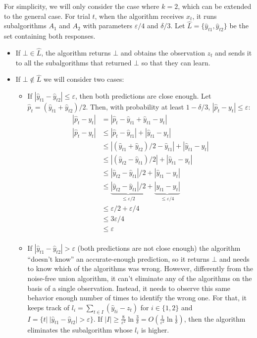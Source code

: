 For simplicity, we will only consider the case where $k = 2$, which can be
extended to the general case. For trial $t$, when the algorithm receives $x_t$,
it runs subalgorithms $A_1$ and $A_2$ with parameters $\varepsilon/4$ and
$\delta/3$. Let $\hat{L} = \{\hat{y}_{t1}, \hat{y}_{t2}\}$ be the set containing
both responses.
\begin{itemize}
  \item If $\bot \in \hat{L}$, the algorithm returns $\bot$ and obtains the
  observation $z_t$ and sends it to all the subalgorithms that returned $\bot$
  so that they can learn.
  \item If $\bot \notin \hat{L}$ we will consider two cases:
  \begin{itemize}
    \item If $|\hat{y}_{t1} - \hat{y}_{t2}| \leq \varepsilon$, then both predictions
    are close enough. Let $\hat{p}_t = (\hat{y}_{t1} + \hat{y}_{t2})/2 $. Then,
    with probability at least $1 - \delta/3$, $|\hat{p}_t - y_t| \leq \varepsilon$:
    \begin{align*}
    |\hat{p}_t - y_t| &= |\hat{p}_t - \hat{y}_{t1} + \hat{y}_{t1} - y_t| \\
    |\hat{p}_t - y_t| &\leq |\hat{p}_t - \hat{y}_{t1}| + |\hat{y}_{t1} - y_t| \\
                      &\leq |(\hat{y}_{t1} + \hat{y}_{t2})/2 - \hat{y}_{t1}| + |\hat{y}_{t1} - y_t| \\
                      &\leq |(\hat{y}_{t2} - \hat{y}_{t1})/2| + |\hat{y}_{t1} - y_t| \\
                      &\leq |\hat{y}_{t2} - \hat{y}_{t1}|/2 + |\hat{y}_{t1} - y_t| \\
                      &\leq \underbrace{|\hat{y}_{t2} - \hat{y}_{t1}|/2}_{\leq \varepsilon/2} + \underbrace{|y_{t1} - y_t|}_{\leq \varepsilon/4} \\
                      &\leq \varepsilon/2 + \varepsilon/4 \\
                      &\leq 3\varepsilon/4 \\
                      &\leq \varepsilon \\
    \end{align*}
    \item If $|\hat{y}_{t1} - \hat{y}_{t2}| > \varepsilon$ (both predictions
    are not close enough) the algorithm ``doesn't know'' an accurate-enough
    prediction, so it returns $\bot$ and needs to know which of the algorithms
    was wrong. However, differently from the noise-free union algorithm, it
    can't eliminate any of the algorithms on the basis of a single observation.
    Instead, it needs to observe this same behavior enough number of times to
    identify the wrong one. For that, it keeps track of $l_i = \sum_{t \in I}
    (\hat{y}_{ti} - z_t)$ for $i \in \{1, 2\}$ and $I = \{t | \ |\hat{y}_{t1} -
    \hat{y}_{t2}| > \varepsilon\}$. If $|I| \geq
    \frac{8}{\varepsilon^2} \ln \frac{3}{\delta} = O\left( \frac{1}{\varepsilon^2}
    \ln \frac{1}{\delta} \right)$, then the algorithm eliminates the subalgorithm
    whose $l_i$ is higher.
  \end{itemize}
\end{itemize}

